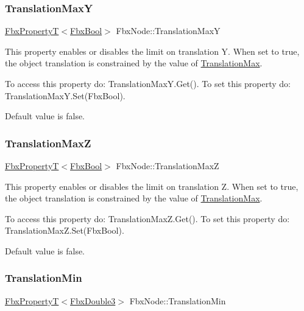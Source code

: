 \subsubsection{\texorpdfstring{Translation\+MaxY}{TranslationMaxY}}
{\footnotesize\ttfamily \hyperlink{class_fbx_property_t}{Fbx\+PropertyT}$<$\hyperlink{fbxtypes_8h_a92e0562b2fe33e76a242f498b362262e}{Fbx\+Bool}$>$ Fbx\+Node\+::\+Translation\+MaxY}

This property enables or disables the limit on translation Y. When set to {\ttfamily true}, the object translation is constrained by the value of \hyperlink{class_fbx_node_ad5867ca599b10137c3caf2eb102eaff7}{Translation\+Max}.

To access this property do\+: Translation\+Max\+Y.\+Get(). To set this property do\+: Translation\+Max\+Y.\+Set(\+Fbx\+Bool).

Default value is false. \mbox{\label{class_fbx_node_a82452c5c84518939525f69ebbf1cd190}} 
\subsubsection{\texorpdfstring{Translation\+MaxZ}{TranslationMaxZ}}
{\footnotesize\ttfamily \hyperlink{class_fbx_property_t}{Fbx\+PropertyT}$<$\hyperlink{fbxtypes_8h_a92e0562b2fe33e76a242f498b362262e}{Fbx\+Bool}$>$ Fbx\+Node\+::\+Translation\+MaxZ}

This property enables or disables the limit on translation Z. When set to {\ttfamily true}, the object translation is constrained by the value of \hyperlink{class_fbx_node_ad5867ca599b10137c3caf2eb102eaff7}{Translation\+Max}.

To access this property do\+: Translation\+Max\+Z.\+Get(). To set this property do\+: Translation\+Max\+Z.\+Set(\+Fbx\+Bool).

Default value is false. \mbox{\label{class_fbx_node_aaaa913d4332c2136f50ae15356521413}} 
\subsubsection{\texorpdfstring{Translation\+Min}{TranslationMin}}
{\footnotesize\ttfamily \hyperlink{class_fbx_property_t}{Fbx\+PropertyT}$<$\hyperlink{fbxtypes_8h_ae0a96f14cde566774c7553aa7523b7a7}{Fbx\+Double3}$>$ Fbx\+Node\+::\+Translation\+Min}

